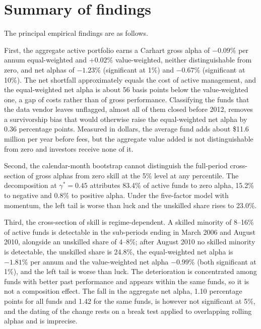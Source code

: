\documentclass[12pt, oneside]{report}
\begin{document}
\section{Summary of findings}
\label{sec:summary_findings}

\noindent The principal empirical findings are as follows.

First, the aggregate active portfolio earns a Carhart gross alpha of
$-0.09\%$ per annum equal-weighted and $+0.02\%$ value-weighted, neither
distinguishable from zero, and net alphas of $-1.23\%$ (significant at
1\%) and $-0.67\%$ (significant at 10\%). The net shortfall approximately
equals the cost of active management, and the equal-weighted net alpha
is about 56 basis points below the value-weighted one, a gap of costs
rather than of gross performance. Classifying the funds that the data
vendor leaves unflagged, almost all of them closed before 2012, removes a
survivorship bias that would otherwise raise the equal-weighted net
alpha by 0.36 percentage points. Measured in dollars, the average fund
adds about \$11.6 million per year before fees, but the aggregate value
added is not distinguishable from zero and investors receive none of
it.

Second, the \textcite{FamaFrench2010} calendar-month bootstrap cannot
distinguish the full-period cross-section of gross alphas from zero skill
at the 5\% level at any percentile. The \textcite{BarrasScailletWermers2010}
decomposition at $\gamma^* = 0.45$ attributes 83.4\% of active funds to
zero alpha, 15.2\% to negative and 0.8\% to positive alpha. Under the
\textcite{FamaFrench2015} five-factor model with momentum, the left tail
is worse than luck and the unskilled share rises to 23.0\%.

Third, the cross-section of skill is regime-dependent. A skilled
minority of 8--16\% of active funds is detectable in the sub-periods
ending in March 2006 and August 2010, alongside an unskilled share of
4--8\%; after August 2010 no skilled minority is detectable, the
unskilled share is 24.8\%, the equal-weighted net alpha is $-1.81\%$ per
annum and the value-weighted net alpha $-0.99\%$ (both significant at
1\%), and the left tail is worse than luck. The deterioration is
concentrated among funds with better past performance and appears
within the same funds, so it is not a composition effect. The fall in
the aggregate net alpha, 1.10 percentage points for all funds and 1.42
for the same funds, is however not significant at 5\%, and the dating of
the change rests on a break test applied to overlapping rolling alphas
and is imprecise.
\end{document}
